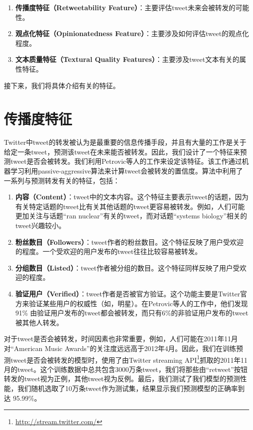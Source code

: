   \begin{enumerate}
\item{\textbf{传播度特征（Retweetability Feature）}}：主要评估tweet未来会被转发的可能性。
\item{\textbf{观点化特征（Opinionatedness Feature）}}：主要涉及如何评估tweet的观点化程度。
\item{\textbf{文本质量特征（Textural Quality Features）}}：主要涉及tweet文本有关的属性特征。
\end{enumerate}
接下来，我们将具体介绍有关的特征。

\section{传播度特征}
Twitter中tweet的转发被认为是最重要的信息传播手段，并且有大量的工作是关于给定一条tweet，预测该tweet在未来能否被转发。因此，我们设计了一个特征来预测tweet是否会被转发。我们利用Petrovic等人的工作来设定该特征。该工作通过机器学习利用passive-aggressive算法来计算tweet会被转发的置信度。算法中利用了一系列与预测转发有关的特征，包括：

 \begin{enumerate}
\item{\textbf{内容（Content）}}：tweet中的文本内容。这个特征主要表示tweet的话题，因为有关特定话题的tweet比有关其他话题的tweet更容易被转发。例如，人们可能更加关注与话题“ran nuclear”有关的tweet，而对话题“systems biology”相关的tweet兴趣较小。
\item{\textbf{粉丝数目（Followers）}}：tweet作者的粉丝数目。这个特征反映了用户受欢迎的程度。一个受欢迎的用户发布的tweet往往比较容易被转发。
\item\textbf{\textbf{分组数目（Listed）}}：tweet作者被分组的数目。这个特征同样反映了用户受欢迎的程度。
\item\textbf{\textbf{验证用户（Verified）}}：tweet作者是否被官方验证。这个功能主要是Twitter官方来验证某些用户的权威性（如，明星）。在Petrovic等人的工作中，他们发现91\% 由验证用户发布的tweet都会被转发，而只有6\%的非验证用户发布的tweet被其他人转发。
\end{enumerate}

对于tweet是否会被转发，时间因素也非常重要，例如，人们可能在2011年11月对“American Music Awards”的关注度远远高于2012年4月。因此，我们在训练预测tweet是否会被转发的模型时，使用了由Twitter streaming API\footnote{\url{http://stream.twitter.com/}}抓取的2011年11月的tweet。这个训练数据中总共包含3000万条tweet，我们将那些由“retweet”按钮转发的tweet视为正例，其他tweet视为反例。最后，我们测试了我们模型的预测性能，我们随机选取了10万条tweet作为测试集，结果显示我们预测模型的正确率到达 95.99\%。

